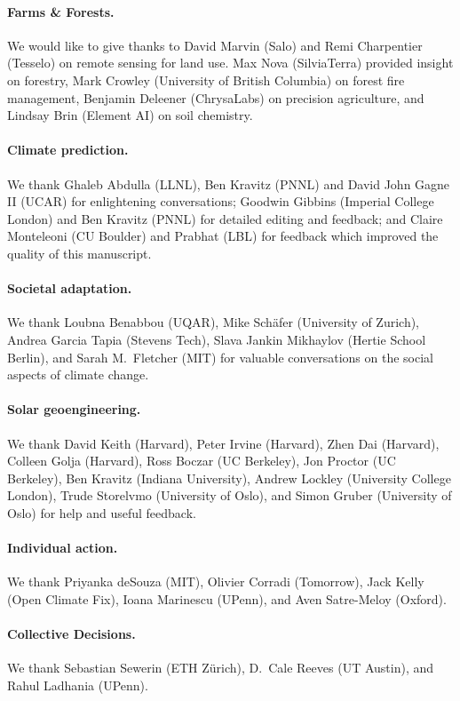 \documentclass[11pt]{report}
\begin{document}
\paragraph*{Farms \& Forests.}
We would like to give thanks to David Marvin (Salo) and Remi Charpentier (Tesselo) on remote sensing for land use. Max Nova (SilviaTerra) provided insight on forestry, Mark Crowley (University of British Columbia) on forest fire management, Benjamin Deleener (ChrysaLabs) on precision agriculture, and Lindsay Brin (Element AI) on soil chemistry.

\paragraph{Climate prediction.} We thank Ghaleb Abdulla (LLNL), Ben Kravitz (PNNL) and David John Gagne II (UCAR) for enlightening conversations; Goodwin Gibbins (Imperial College London) and Ben Kravitz (PNNL) for detailed editing and feedback; and Claire Monteleoni (CU Boulder) and Prabhat (LBL) for feedback which improved the quality of this manuscript.

\paragraph*{Societal adaptation.}
We thank Loubna Benabbou (UQAR), Mike Sch{\"a}fer (University of Zurich), Andrea Garcia Tapia (Stevens Tech), Slava Jankin Mikhaylov (Hertie School Berlin), and Sarah M.~Fletcher (MIT) for valuable conversations on the social aspects of climate change. 

\paragraph*{Solar geoengineering.}
We thank David Keith (Harvard), Peter Irvine (Harvard), Zhen Dai (Harvard), Colleen Golja (Harvard), Ross Boczar (UC Berkeley), Jon Proctor (UC Berkeley), Ben Kravitz (Indiana University),  Andrew Lockley (University College London), Trude Storelvmo (University of Oslo), and Simon Gruber (University of Oslo) for help and useful feedback.

\paragraph*{Individual action.} We thank Priyanka deSouza (MIT), Olivier Corradi (Tomorrow), Jack Kelly (Open Climate Fix), Ioana Marinescu (UPenn), and Aven Satre-Meloy (Oxford).

\paragraph*{Collective Decisions.}
We thank Sebastian Sewerin (ETH Z\"urich), D.~Cale Reeves (UT Austin), and Rahul Ladhania (UPenn).
\end{document}
